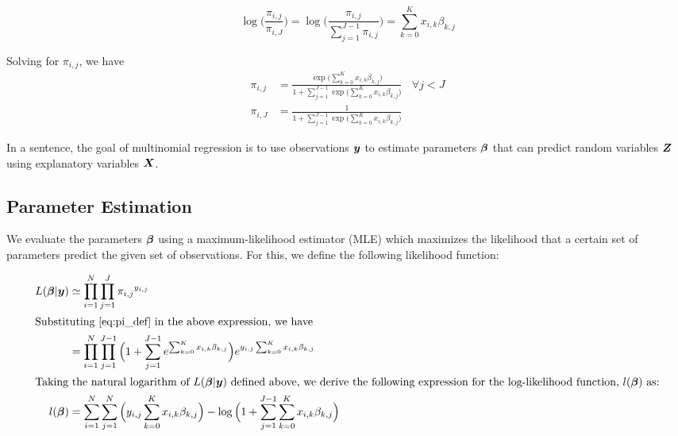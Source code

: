 \begin{equation}
 \log \Big( \frac{\pi_{i,j}}{\pi_{i,J}}\Big)
    = \log \Big( \frac{\pi_{i,j}}{\sum_{j=1}^{J-1}\pi_{i,j}}\Big)
    = \sum_{k=0}^{K} x_{i,k}\beta_{k,j}
\end{equation}

Solving for $\pi_{i,j}$, we have
\begin{subequations}
\label{eq:pi_def}
\begin{align}
\pi_{i,j} &= \frac{\exp \big( {\sum_{k=0}^{K} x_{i,k}\beta_{k,j}}\big)}{1 + \sum_{j=1}^{J-1}\exp{\big( \sum_{k=0}^{K} x_{i,k}\beta_{k,j}\big)}}\ \ \ \  \forall j < J\\
\pi_{i,J} &= \frac{1}{1 + \sum_{j=1}^{J-1}\exp{\big( \sum_{k=0}^{K} x_{i,k}\beta_{k,j}\big)}}
\end{align}
\end{subequations}

In a sentence, the goal of multinomial regression is to use observations
$\boldsymbol{y}$ to estimate parameters $\boldsymbol{\beta}$ that can predict random variables
$\boldsymbol{Z}$ using explanatory variables $\boldsymbol{X}$.

\subsection{Parameter Estimation}

We evaluate the parameters $\boldsymbol{\beta}$ using a maximum-likelihood estimator
(MLE) which maximizes the likelihood that a certain set of parameters predict
the given set of observations. For this, we define the following likelihood
function:

\begin{align}
L(\boldsymbol{\beta}|\boldsymbol{y}) &\simeq \prod_{i=1}^{N}\prod_{j=1}^{J}{\pi_{i,j}}^{y_{i,j}} \\
\intertext{Substituting \eqref{eq:pi_def} in the above expression, we have}
&= \prod_{i=1}^{N}\prod_{j=1}^{J-1} \Big( 1 + \sum_{j=1}^{J-1} e^{\sum_{k=0}^{K} x_{i,k}\beta_{k,j}} \Big)  e^{y_{i,j} \sum_{k=0}^{K} x_{i,k}\beta_{k,j}} \\
\intertext{Taking the natural logarithm of $L(\boldsymbol{\beta}|\boldsymbol{y})$ defined above, we derive the following expression for the log-likelihood function, $l(\boldsymbol{\beta})$ as:}
l(\boldsymbol{\beta}) &= \sum_{i=1}^{N}\sum_{j=1}^{N} \Big( y_{i,j} \sum_{k=0}^{K} x_{i,k}\beta_{k,j} \Big) - \log \Big( 1 + \sum_{j=1}^{J-1} \sum_{k=0}^{K} x_{i,k}\beta_{k,j}\Big) \label{eq:log_lik}
\end{align}

